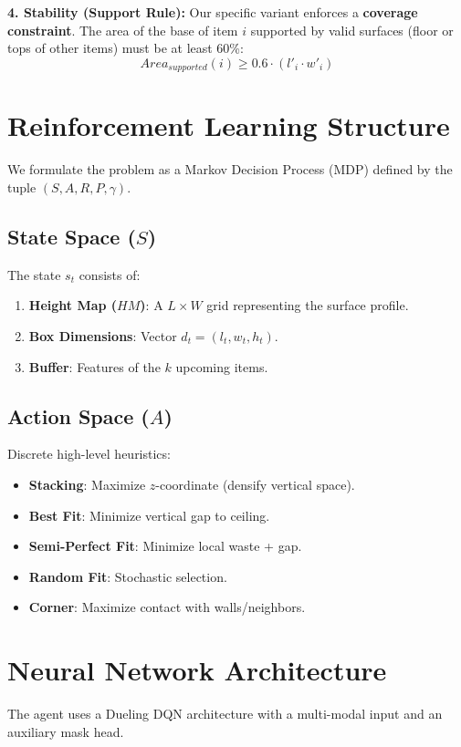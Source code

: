 \documentclass{article}
\begin{document}
\textbf{4. Stability (Support Rule):}
Our specific variant enforces a \textbf{coverage constraint}. The area of the base of item $i$ supported by valid surfaces (floor or tops of other items) must be at least 60\%:
\begin{equation}
    Area_{supported}(i) \ge 0.6 \cdot (l'_i \cdot w'_i)
\end{equation}

\section{Reinforcement Learning Structure}
We formulate the problem as a Markov Decision Process (MDP) defined by the tuple $(S, A, R, P, \gamma)$.

\subsection{State Space ($S$)}
The state $s_t$ consists of:
\begin{enumerate}
    \item \textbf{Height Map ($HM$)}: A $L \times W$ grid representing the surface profile.
    \item \textbf{Box Dimensions}: Vector $d_t = (l_t, w_t, h_t)$.
    \item \textbf{Buffer}: Features of the $k$ upcoming items.
\end{enumerate}

\subsection{Action Space ($A$)}
Discrete high-level heuristics:
\begin{itemize}
    \item \textbf{Stacking}: Maximize $z$-coordinate (densify vertical space).
    \item \textbf{Best Fit}: Minimize vertical gap to ceiling.
    \item \textbf{Semi-Perfect Fit}: Minimize local waste + gap.
    \item \textbf{Random Fit}: Stochastic selection.
    \item \textbf{Corner}: Maximize contact with walls/neighbors.
\end{itemize}

\section{Neural Network Architecture}
The agent uses a Dueling DQN architecture with a multi-modal input and an auxiliary mask head.
\end{document}
